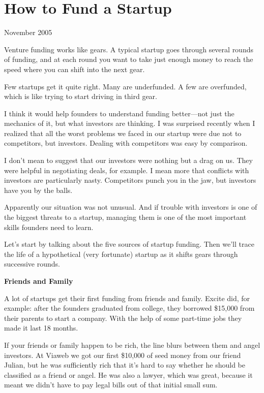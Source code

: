 \chapter{How to Fund a Startup}

November 2005

Venture funding works like gears. A typical startup goes through several
rounds of funding, and at each round you want to take just enough money
to reach the speed where you can shift into the next gear.

Few startups get it quite right. Many are underfunded. A few are
overfunded, which is like trying to start driving in third gear.

I think it would help founders to understand funding better---not just
the mechanics of it, but what investors are thinking. I was surprised
recently when I realized that all the worst problems we faced in our
startup were due not to competitors, but investors. Dealing with
competitors was easy by comparison.

I don't mean to suggest that our investors were nothing but a drag on
us. They were helpful in negotiating deals, for example. I mean more
that conflicts with investors are particularly nasty. Competitors punch
you in the jaw, but investors have you by the balls.

Apparently our situation was not unusual. And if trouble with investors
is one of the biggest threats to a startup, managing them is one of the
most important skills founders need to learn.

Let's start by talking about the five sources of startup funding. Then
we'll trace the life of a hypothetical (very fortunate) startup as it
shifts gears through successive rounds.

\textbf{Friends and Family}

A lot of startups get their first funding from friends and family.
Excite did, for example: after the founders graduated from college, they
borrowed \$15,000 from their parents to start a company. With the help
of some part-time jobs they made it last 18 months.

If your friends or family happen to be rich, the line blurs between them
and angel investors. At Viaweb we got our first \$10,000 of seed money
from our friend Julian, but he was sufficiently rich that it's hard to
say whether he should be classified as a friend or angel. He was also a
lawyer, which was great, because it meant we didn't have to pay legal
bills out of that initial small sum.

